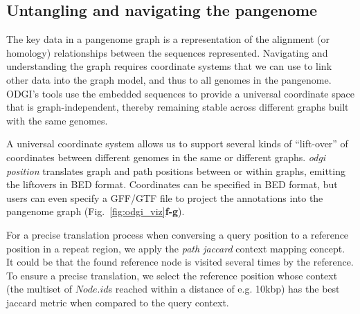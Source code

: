 \documentclass{bioinfo}
\begin{document}
\subsection{Untangling and navigating the pangenome}
\label{sec:untangle}


The key data in a pangenome graph is a representation of the alignment (or homology) relationships between the sequences represented.
Navigating and understanding the graph requires coordinate systems that we can use to link other data into the graph model, and thus to all genomes in the pangenome.
ODGI's tools use the embedded sequences to provide a universal coordinate space that is graph-independent, thereby remaining stable across different graphs built with the same genomes.

A universal coordinate system allows us to support several kinds of ``lift-over'' of coordinates between different genomes in the same or different graphs.
\textit{odgi position} translates graph and path positions between or within graphs, emitting the liftovers in BED format.
Coordinates can be specified in BED format, but users can even specify a GFF/GTF file to project the annotations into the pangenome graph (Fig.~\ref{fig:odgi_viz}\textbf{f-g}). 

For a precise translation process when conversing a query position to a reference position in a repeat region, we apply the \textit{path jaccard} context mapping concept.
It could be that the found reference node is visited several times by the reference.
To ensure a precise translation, we select the reference position whose context (the multiset of $Node.id$s reached within a distance of e.g. 10kbp) has the best jaccard metric when compared to the query context.
\end{document}
